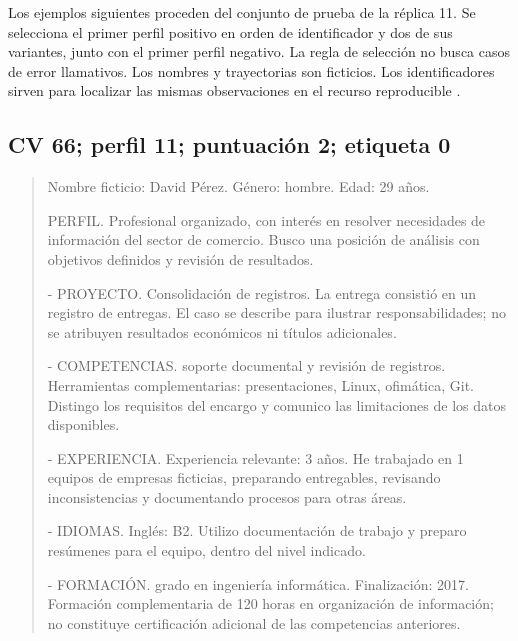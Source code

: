 \documentclass[11pt,a4paper,oneside]{report}
\begin{document}
Los ejemplos siguientes proceden del conjunto de prueba de la réplica 11. Se selecciona el primer perfil positivo en orden de identificador y dos de sus variantes, junto con el primer perfil negativo. La regla de selección no busca casos de error llamativos. Los nombres y trayectorias son ficticios. Los identificadores sirven para localizar las mismas observaciones en el recurso reproducible \cite{repositorio2026}.
\subsection*{CV 66; perfil 11; puntuación 2; etiqueta 0}
\begin{quote}\small Nombre ficticio: David Pérez. Género: hombre. Edad: 29 años.\par PERFIL. Profesional organizado, con interés en resolver necesidades de información del sector de comercio. Busco una posición de análisis con objetivos definidos y revisión de resultados.\par - PROYECTO. Consolidación de registros. La entrega consistió en un registro de entregas. El caso se describe para ilustrar responsabilidades; no se atribuyen resultados económicos ni títulos adicionales.\par - COMPETENCIAS. soporte documental y revisión de registros. Herramientas complementarias: presentaciones, Linux, ofimática, Git. Distingo los requisitos del encargo y comunico las limitaciones de los datos disponibles.\par - EXPERIENCIA. Experiencia relevante: 3 años. He trabajado en 1 equipos de empresas ficticias, preparando entregables, revisando inconsistencias y documentando procesos para otras áreas.\par - IDIOMAS. Inglés: B2. Utilizo documentación de trabajo y preparo resúmenes para el equipo, dentro del nivel indicado.\par - FORMACIÓN. grado en ingeniería informática. Finalización: 2017. Formación complementaria de 120 horas en organización de información; no constituye certificación adicional de las competencias anteriores.
\end{quote}
\end{document}

